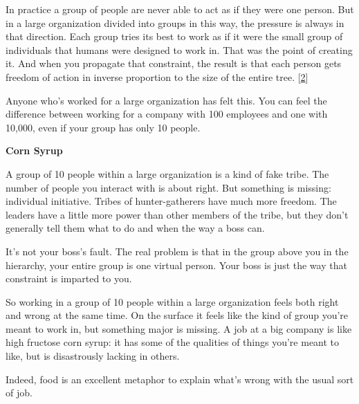 In
                    practice a group of people are never able to act as if they
                    were one person. But in a large organization divided into
                    groups in this way, the pressure is always in that
                    direction. Each group tries its best to work as if it were
                    the small group of individuals that humans were designed to
                    work in. That was the point of creating it. And when you
                    propagate that constraint, the result is that each person
                    gets freedom of action in inverse proportion to the size of
                    the entire tree.
                    [\href{\#f2n}{2}]

Anyone who's worked for a large organization
                    has felt this. You can feel the difference between working
                    for a company with 100 employees and one with 10,000, even
                    if your group has only 10 people.


                    \textbf{Corn Syrup}

A group of 10 people within a
                    large organization is a kind of fake tribe. The number of
                    people you interact with is about right. But something is
                    missing: individual initiative. Tribes of hunter-gatherers
                    have much more freedom. The leaders have a little more power
                    than other members of the tribe, but they don't generally
                    tell them what to do and when the way a boss can.

It's
                    not your boss's fault. The real problem is that in the group
                    above you in the hierarchy, your entire group is one virtual
                    person. Your boss is just the way that constraint is
                    imparted to you.

So working in a group of 10
                    people within a large organization feels both right and
                    wrong at the same time. On the surface it feels like the
                    kind of group you're meant to work in, but something major
                    is missing. A job at a big company is like high fructose
                    corn syrup: it has some of the qualities of things you're
                    meant to like, but is disastrously lacking in others.

Indeed,
                    food is an excellent metaphor to explain what's wrong with
                    the usual sort of job.

